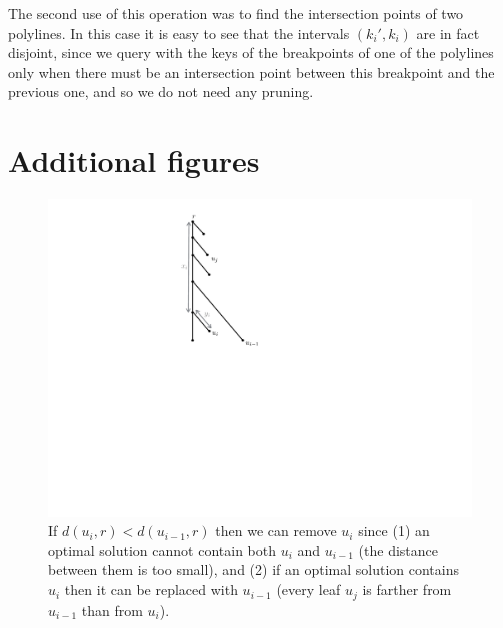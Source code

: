 \documentclass[a4paper,UKenglish]{lipics-v2016}
\theoremstyle{plain}
\begin{document}
The second use of this operation was to find the intersection points of two polylines. In this case it is easy to see that the intervals $(k_i',k_i)$ are in fact disjoint, since we query with the keys of the breakpoints of one of the polylines only when there must be an intersection point between this breakpoint and the previous one, and so we do not need any pruning.


\section{Additional figures}

\begin{figure}[ht]
\begin{center}
\includegraphics[scale=0.45]{caterpillar}
\end{center}
\caption{If $d(u_i,r)<d(u_{i-1},r)$ then  we can remove $u_{i}$ since (1) an optimal solution cannot contain both $u_{i}$ and $u_{i-1}$ (the distance between them is too small), and (2) if an optimal solution contains $u_{i}$ then it can be replaced with $u_{i-1}$ (every leaf $u_j$ is farther from $u_{i-1}$ than from $u_i$). \label{fig:pruning}}
\end{figure}
\end{document}
